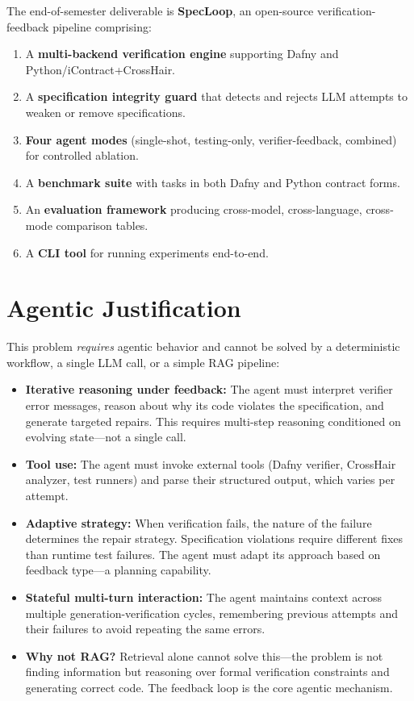 \documentclass[11pt,a4paper]{article}
\begin{document}
The end-of-semester deliverable is \textbf{SpecLoop}, an open-source verification-feedback pipeline comprising:

\begin{enumerate}[noitemsep]
    \item A \textbf{multi-backend verification engine} supporting Dafny and Python/iContract+CrossHair.
    \item A \textbf{specification integrity guard} that detects and rejects LLM attempts to weaken or remove specifications.
    \item \textbf{Four agent modes} (single-shot, testing-only, verifier-feedback, combined) for controlled ablation.
    \item A \textbf{benchmark suite} with tasks in both Dafny and Python contract forms.
    \item An \textbf{evaluation framework} producing cross-model, cross-language, cross-mode comparison tables.
    \item A \textbf{CLI tool} for running experiments end-to-end.
\end{enumerate}

\section{Agentic Justification}

This problem \textit{requires} agentic behavior and cannot be solved by a deterministic workflow, a single LLM call, or a simple RAG pipeline:

\begin{itemize}[noitemsep]
    \item \textbf{Iterative reasoning under feedback:} The agent must interpret verifier error messages, reason about why its code violates the specification, and generate targeted repairs. This requires multi-step reasoning conditioned on evolving state---not a single call.
    \item \textbf{Tool use:} The agent must invoke external tools (Dafny verifier, CrossHair analyzer, test runners) and parse their structured output, which varies per attempt.
    \item \textbf{Adaptive strategy:} When verification fails, the nature of the failure determines the repair strategy. Specification violations require different fixes than runtime test failures. The agent must adapt its approach based on feedback type---a planning capability.
    \item \textbf{Stateful multi-turn interaction:} The agent maintains context across multiple generation-verification cycles, remembering previous attempts and their failures to avoid repeating the same errors.
    \item \textbf{Why not RAG?} Retrieval alone cannot solve this---the problem is not finding information but reasoning over formal verification constraints and generating correct code. The feedback loop is the core agentic mechanism.
\end{itemize}
\end{document}
